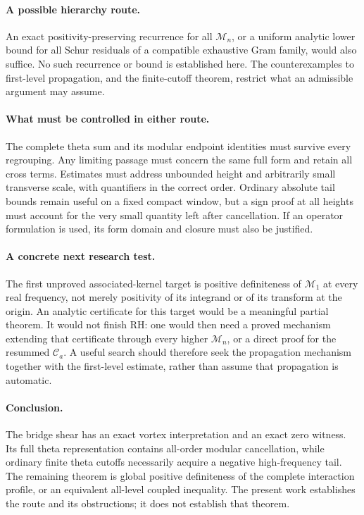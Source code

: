 \documentclass[11pt,letterpaper]{article}
\numberwithin{equation}{section}
\theoremstyle{definition}
\theoremstyle{remark}
\newcommand{\calC}{\mathcal C}
\newcommand{\calM}{\mathcal M}
\begin{document}
\paragraph{A possible hierarchy route.}
An exact positivity-preserving recurrence for all $\calM_n$, or a uniform analytic lower bound for all Schur residuals of a compatible exhaustive Gram family, would also suffice. No such recurrence or bound is established here. The counterexamples to first-level propagation, and the finite-cutoff theorem, restrict what an admissible argument may assume.

\paragraph{What must be controlled in either route.}
The complete theta sum and its modular endpoint identities must survive every regrouping. Any limiting passage must concern the same full form and retain all cross terms. Estimates must address unbounded height and arbitrarily small transverse scale, with quantifiers in the correct order. Ordinary absolute tail bounds remain useful on a fixed compact window, but a sign proof at all heights must account for the very small quantity left after cancellation. If an operator formulation is used, its form domain and closure must also be justified.

\paragraph{A concrete next research test.}
The first unproved associated-kernel target is positive definiteness of $\calM_1$ at every real frequency, not merely positivity of its integrand or of its transform at the origin. An analytic certificate for this target would be a meaningful partial theorem. It would not finish RH: one would then need a proved mechanism extending that certificate through every higher $\calM_n$, or a direct proof for the resummed $\calC_a$. A useful search should therefore seek the propagation mechanism together with the first-level estimate, rather than assume that propagation is automatic.

\paragraph{Conclusion.}
The bridge shear has an exact vortex interpretation and an exact zero witness. Its full theta representation contains all-order modular cancellation, while ordinary finite theta cutoffs necessarily acquire a negative high-frequency tail. The remaining theorem is global positive definiteness of the complete interaction profile, or an equivalent all-level coupled inequality. The present work establishes the route and its obstructions; it does not establish that theorem.
\end{document}

